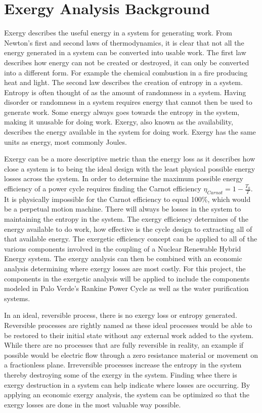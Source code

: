 \documentclass[12pt]{UIdahoMastersThesis}
\begin{document}
\section{Exergy Analysis Background}
Exergy describes the useful energy in a system for generating work. From Newton's first and second laws of thermodynamics, it is clear that not all the energy generated in a system can be converted into usable work.  The first law describes how energy can not be created or destroyed, it can only be converted into a different form.  For example the chemical combustion in a fire producing heat and light. The second law describes the creation of entropy in a system. Entropy is often thought of as the amount of randomness in a system.  Having disorder or randomness in a system requires energy that cannot then be used to generate work. Some energy always goes towards the entropy in the system, making it unusable for doing work. Exergy, also known as the availability, describes the energy available in the system for doing work. Exergy has the same units as energy, most commonly Joules. 

Exergy can be a more descriptive metric than the energy loss as it describes how close a system is to being the ideal design with the least physical possible energy losses across the system. In order to determine the maximum possible energy efficiency of a power cycle requires finding the Carnot efficiency $\eta_{Carnot}=1-\frac{T_0}{T}$.  It is physically impossible for the Carnot efficiency to equal 100\%, which would be a perpetual motion machine.  There will always be losses in the system to maintaining the entropy in the system. The exergy efficiency determines of the energy available to do work, how effective is the cycle design to extracting all of that available energy.  The exergetic efficiency concept can be applied to all of the various components involved in the coupling of a Nuclear Renewable Hybrid Energy system. The exergy analysis can then be combined with an economic analysis determining where exergy losses are most costly. For this project, the components in the exergetic analysis will be applied to include the components modeled in Palo Verde's Rankine Power Cycle as well as the water purification systems.

In an ideal, reversible process, there is no exergy loss or entropy generated. Reversible processes are rightly named as these ideal processes would be able to be restored to their initial state without any external work added to the system. While there are no processes that are fully reversible in reality, an example if possible would be electric flow through a zero resistance material or movement on a fractionless plane. Irreversible processes increase the entropy in the system thereby destroying some of the exergy in the system. Finding whee there is exergy destruction in a system can help indicate where losses are occurring. By applying an economic exergy analysis, the system can be optimized so that the exergy losses are done in the most valuable way possible.
\end{document}

